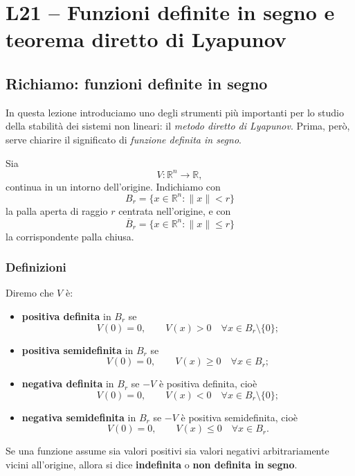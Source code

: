 
\chapter{L21 -- Funzioni definite in segno e teorema diretto di Lyapunov}
\label{chap:L21}

\section{Richiamo: funzioni definite in segno}

In questa lezione introduciamo uno degli strumenti più importanti per lo studio della stabilità dei sistemi non lineari: il \emph{metodo diretto di Lyapunov}.  
Prima, però, serve chiarire il significato di \emph{funzione definita in segno}.

Sia
\[
V:\mathbb{R}^n \to \mathbb{R},
\]
continua in un intorno dell'origine. Indichiamo con
\[
B_r=\{x\in\mathbb{R}^n:\|x\|<r\}
\]
la palla aperta di raggio \(r\) centrata nell'origine, e con
\[
\overline{B}_r=\{x\in\mathbb{R}^n:\|x\|\le r\}
\]
la corrispondente palla chiusa.

\subsection{Definizioni}

Diremo che \(V\) è:

\begin{itemize}
    \item \textbf{positiva definita} in \(B_r\) se
    \[
    V(0)=0,
    \qquad
    V(x)>0 \quad \forall x\in B_r\setminus\{0\};
    \]

    \item \textbf{positiva semidefinita} in \(B_r\) se
    \[
    V(0)=0,
    \qquad
    V(x)\ge 0 \quad \forall x\in B_r;
    \]

    \item \textbf{negativa definita} in \(B_r\) se \(-V\) è positiva definita, cioè
    \[
    V(0)=0,
    \qquad
    V(x)<0 \quad \forall x\in B_r\setminus\{0\};
    \]

    \item \textbf{negativa semidefinita} in \(B_r\) se \(-V\) è positiva semidefinita, cioè
    \[
    V(0)=0,
    \qquad
    V(x)\le 0 \quad \forall x\in B_r.
    \]
\end{itemize}

Se una funzione assume sia valori positivi sia valori negativi arbitrariamente vicini all'origine, allora si dice \textbf{indefinita} o \textbf{non definita in segno}.

